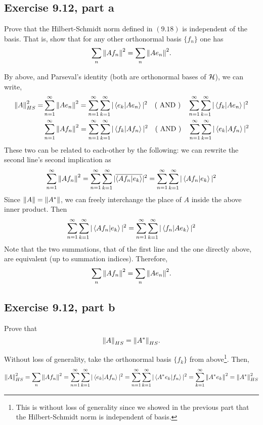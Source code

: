 \subsection{Exercise 9.12, part a}
Prove that the Hilbert-Schmidt norm defined in $(9.18)$ is independent of the basis. That is, show that for any other orthonormal basis $\{f_n\}$ one has
\[\sum_n \norm{Af_n}^2 = \sum_n\norm{Ae_n}^2.\]
\partbreak
\begin{solution}

    By above, and Parseval's identity (both are orthonormal bases of $\mathcal{H}$), we can write,
    \begin{align*}
        \norm{A}_{HS}^2 =& \sum_{n = 1}^\infty\norm{Ae_n}^2 = \sum_{n = 1}^{\infty}\sum_{k = 1}^{\infty}|\braket{e_k}{Ae_n}|^2 \quad \text{( AND )} \quad \sum_{n = 1}^{\infty}\sum_{k = 1}^{\infty} |\braket{f_k}{Ae_n}|^2\\
        &\sum_{n = 1}^{\infty}\norm{Af_n}^2 = \sum_{n = 1}^{\infty}\sum_{k = 1}^{\infty} |\braket{f_k}{Af_n}|^2 \quad \text{( AND )} \quad \sum_{n = 1}^{\infty}\sum_{k = 1}^{\infty} |\braket{e_k}{Af_n}|^2
    \end{align*}
    These two can be related to each-other by the following: we can rewrite the second line's second implication as
    \[\sum_{n = 1}^{\infty}\norm{Af_n}^2 = \sum_{n = 1}^{\infty}\sum_{k = 1}^{\infty} |\overline{\braket{Af_n}{e_k}}|^2 = \sum_{n = 1}^{\infty}\sum_{k = 1}^{\infty} |\braket{Af_n}{e_k}|^2\]
    Since $\norm{A} = \norm{A^{*}}$, we can freely interchange the place of $A$ inside the above inner product. Then
    \[ \sum_{n = 1}^{\infty}\sum_{k = 1}^{\infty} |\braket{Af_n}{e_k}|^2 =  \sum_{n = 1}^{\infty}\sum_{k = 1}^{\infty} |\braket{f_n}{Ae_k}|^2\]
    Note that the two summations, that of the first line and the one directly above, are equivalent (up to summation indices). Therefore, 
    \[\sum_n\norm{Af_n}^2 = \sum_n\norm{Ae_n}^2.\]
\end{solution}
\newpage
\subsection{Exercise 9.12, part b}
Prove that 
\[\norm{A}_{HS} = \norm{A^{*}}_{HS}.\]
\partbreak
\begin{solution}

    Without loss of generality, take the orthonormal basis $\{f_k\}$ from above\footnote{This is without loss of generality since we showed in the previous part that the Hilbert-Schmidt norm is independent of basis.}. Then,
    \[\norm{A}_{HS}^2 = \sum_n \norm{Af_n}^2 = \sum_{n = 1}^{\infty}\sum_{k = 1}^{\infty}|\braket{e_k}{Af_n}|^2 = \sum_{n = 1}^{\infty}\sum_{k = 1}^{\infty}|\braket{A^{*} e_k}{f_n}|^2 = \sum_{k = 1}^{\infty}\norm{A^{*} e_k}^2 = \norm{A^{*}}_{HS}^2\]
\end{solution}
